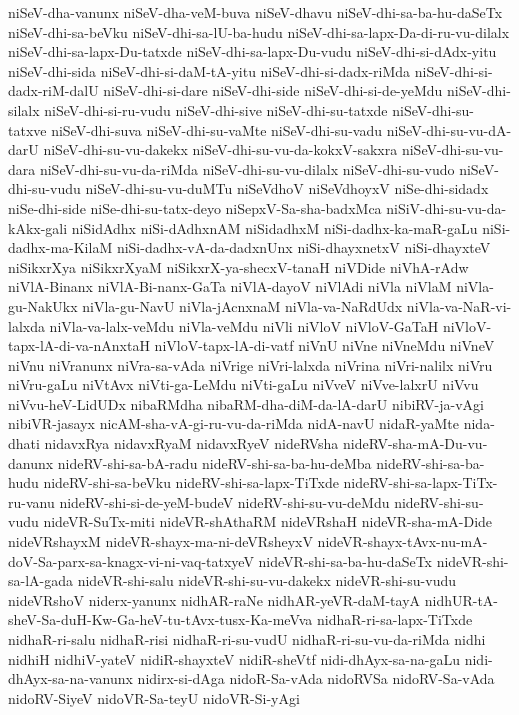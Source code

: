 {niSeV-dha-vanunx
niSeV-dha-veM-buva
niSeV-dhavu
niSeV-dhi-sa-ba-hu-daSeTx
niSeV-dhi-sa-beVku
niSeV-dhi-sa-lU-ba-hudu
niSeV-dhi-sa-lapx-Da-di-ru-vu-dilalx
niSeV-dhi-sa-lapx-Du-tatxde
niSeV-dhi-sa-lapx-Du-vudu
niSeV-dhi-si-dAdx-yitu
niSeV-dhi-sida
niSeV-dhi-si-daM-tA-yitu
niSeV-dhi-si-dadx-riMda
niSeV-dhi-si-dadx-riM-dalU
niSeV-dhi-si-dare
niSeV-dhi-side
niSeV-dhi-si-de-yeMdu
niSeV-dhi-silalx
niSeV-dhi-si-ru-vudu
niSeV-dhi-sive
niSeV-dhi-su-tatxde
niSeV-dhi-su-tatxve
niSeV-dhi-suva
niSeV-dhi-su-vaMte
niSeV-dhi-su-vadu
niSeV-dhi-su-vu-dA-darU
niSeV-dhi-su-vu-dakekx
niSeV-dhi-su-vu-da-kokxV-sakxra
niSeV-dhi-su-vu-dara
niSeV-dhi-su-vu-da-riMda
niSeV-dhi-su-vu-dilalx
niSeV-dhi-su-vudo
niSeV-dhi-su-vudu
niSeV-dhi-su-vu-duMTu
niSeVdhoV
niSeVdhoyxV
niSe-dhi-sidadx
niSe-dhi-side
niSe-dhi-su-tatx-deyo
niSepxV-Sa-sha-badxMca
niSiV-dhi-su-vu-da-kAkx-gali
niSidAdhx
niSi-dAdhxnAM
niSidadhxM
niSi-dadhx-ka-maR-gaLu
niSi-dadhx-ma-KilaM
niSi-dadhx-vA-da-dadxnUnx
niSi-dhayxnetxV
niSi-dhayxteV
niSikxrXya
niSikxrXyaM
niSikxrX-ya-shecxV-tanaH
niVDide
niVhA-rAdw
niVlA-Binanx
niVlA-Bi-nanx-GaTa
niVlA-dayoV
niVlAdi
niVla
niVlaM
niVla-gu-NakUkx
niVla-gu-NavU
niVla-jAcnxnaM
niVla-va-NaRdUdx
niVla-va-NaR-vi-lalxda
niVla-va-lalx-veMdu
niVla-veMdu
niVli
niVloV
niVloV-GaTaH
niVloV-tapx-lA-di-va-nAnxtaH
niVloV-tapx-lA-di-vatf
niVnU
niVne
niVneMdu
niVneV
niVnu
niVranunx
niVra-sa-vAda
niVrige
niVri-lalxda
niVrina
niVri-nalilx
niVru
niVru-gaLu
niVtAvx
niVti-ga-LeMdu
niVti-gaLu
niVveV
niVve-lalxrU
niVvu
niVvu-heV-LidUDx
nibaRMdha
nibaRM-dha-diM-da-lA-darU
nibiRV-ja-vAgi
nibiVR-jasayx
nicAM-sha-vA-gi-ru-vu-da-riMda
nidA-navU
nidaR-yaMte
nida-dhati
nidavxRya
nidavxRyaM
nidavxRyeV
nideRVsha
nideRV-sha-mA-Du-vu-danunx
nideRV-shi-sa-bA-radu
nideRV-shi-sa-ba-hu-deMba
nideRV-shi-sa-ba-hudu
nideRV-shi-sa-beVku
nideRV-shi-sa-lapx-TiTxde
nideRV-shi-sa-lapx-TiTx-ru-vanu
nideRV-shi-si-de-yeM-budeV
nideRV-shi-su-vu-deMdu
nideRV-shi-su-vudu
nideVR-SuTx-miti
nideVR-shAthaRM
nideVRshaH
nideVR-sha-mA-Dide
nideVRshayxM
nideVR-shayx-ma-ni-deVRsheyxV
nideVR-shayx-tAvx-nu-mA-doV-Sa-parx-sa-knagx-vi-ni-vaq-tatxyeV
nideVR-shi-sa-ba-hu-daSeTx
nideVR-shi-sa-lA-gada
nideVR-shi-salu
nideVR-shi-su-vu-dakekx
nideVR-shi-su-vudu
nideVRshoV
niderx-yanunx
nidhAR-raNe
nidhAR-yeVR-daM-tayA
nidhUR-tA-sheV-Sa-duH-Kw-Ga-heV-tu-tAvx-tusx-Ka-meVva
nidhaR-ri-sa-lapx-TiTxde
nidhaR-ri-salu
nidhaR-risi
nidhaR-ri-su-vudU
nidhaR-ri-su-vu-da-riMda
nidhi
nidhiH
nidhiV-yateV
nidiR-shayxteV
nidiR-sheVtf
nidi-dhAyx-sa-na-gaLu
nidi-dhAyx-sa-na-vanunx
nidirx-si-dAga
nidoR-Sa-vAda
nidoRVSa
nidoRV-Sa-vAda
nidoRV-SiyeV
nidoVR-Sa-teyU
nidoVR-Si-yAgi
}
